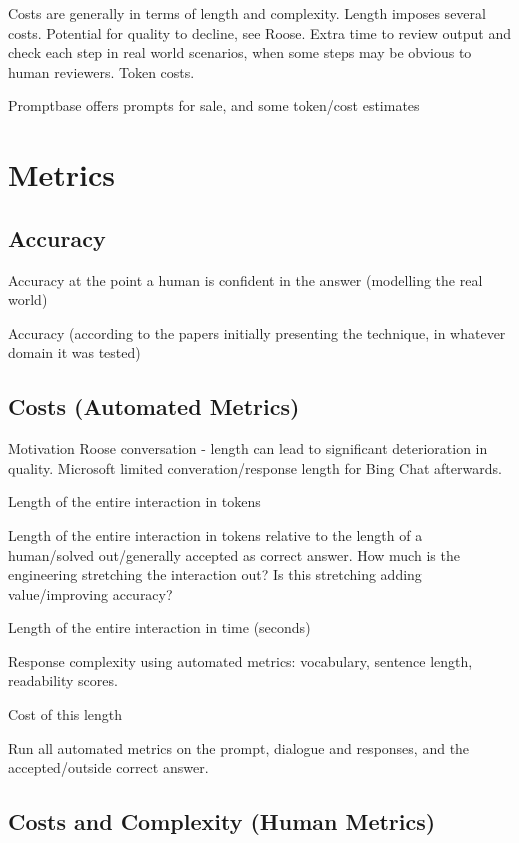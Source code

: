 \documentclass[11pt]{article}
\begin{document}
Costs are generally in terms of length and complexity.
Length imposes several costs. Potential for quality to decline, see Roose. Extra time to review output and check each step in real world scenarios, when some steps may be obvious to human reviewers. Token costs.

\cite{noauthor_promptbase_nodate}
Promptbase offers prompts for sale, and some token/cost estimates

\section{Metrics}

\subsection{Accuracy}

Accuracy at the point a human is confident in the answer (modelling the real world)

Accuracy (according to the papers initially presenting the technique, in whatever domain it was tested)

\subsection{Costs (Automated Metrics)}

Motivation
Roose conversation - length can lead to significant deterioration in quality. Microsoft limited converation/response length for Bing Chat afterwards. \cite{roose_conversation_2023}

Length of the entire interaction in tokens

Length of the entire interaction in tokens relative to the length of a human/solved out/generally accepted as correct answer. How much is the engineering stretching the interaction out? Is this stretching adding value/improving accuracy?

Length of the entire interaction in time (seconds)

Response complexity using automated metrics: vocabulary, sentence length, readability scores.

Cost of this length

Run all automated metrics on the prompt, dialogue and responses, and the accepted/outside correct answer.

\subsection{Costs and Complexity (Human Metrics)}
\end{document}
